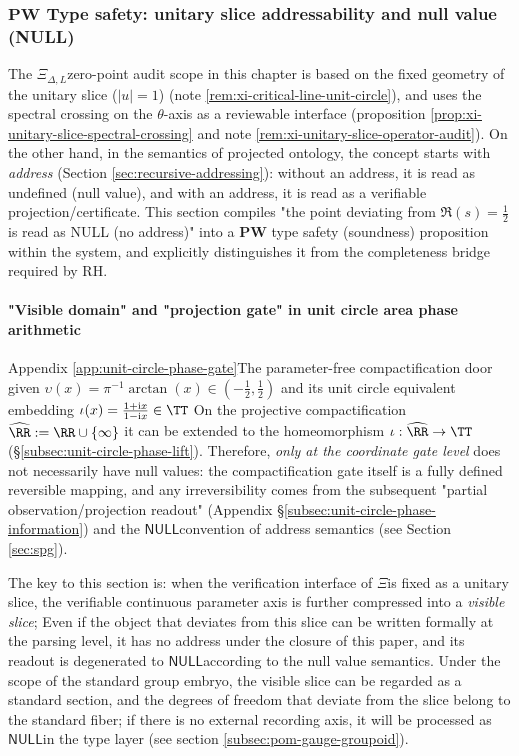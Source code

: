 \subsubsection{\texorpdfstring{$\mathbf{PW}$}{PW} Type safety: unitary slice addressability and null value (NULL)}\label{subsec:xi-pw-type-safety-null}
The \(\Xi_{\Delta,L}\) ​​zero-point audit scope in this chapter is based on the fixed geometry of the unitary slice (\(|u|=1\)) (note \ref{rem:xi-critical-line-unit-circle}), and uses the spectral crossing on the \(\theta\)-axis as a reviewable interface (proposition \ref{prop:xi-unitary-slice-spectral-crossing} and note \ref{rem:xi-unitary-slice-operator-audit}).
On the other hand, in the semantics of projected ontology, the concept starts with \emph{address} (Section \ref{sec:recursive-addressing}): without an address, it is read as undefined (null value), and with an address, it is read as a verifiable projection/certificate.
This section compiles "the point deviating from \(\Re(s)=\tfrac12\) ​​is read as NULL (no address)" into a \(\mathbf{PW}\) type safety (soundness) proposition within the system, and explicitly distinguishes it from the completeness bridge required by RH.

\paragraph{"Visible domain" and "projection gate" in unit circle area phase arithmetic}
Appendix \ref{app:unit-circle-phase-gate} ​​The parameter-free compactification door given
\(\upsilon(x)=\pi^{-1}\arctan(x)\in(-\tfrac12,\tfrac12)\)
and its unit circle equivalent embedding
\(\iota(x)=\frac{1+\mathrm{i}x}{1-\mathrm{i}x}\in\TT\)
On the projective compactification \(\widehat{\RR}:=\RR\cup\{\infty\}\) ​​it can be extended to the homeomorphism \(\iota:\widehat{\RR}\to\TT\) (\S\ref{subsec:unit-circle-phase-lift}).
Therefore, \emph{only at the coordinate gate level} does not necessarily have null values: the compactification gate itself is a fully defined reversible mapping, and any irreversibility comes from the subsequent "partial observation/projection readout" (Appendix \S\ref{subsec:unit-circle-phase-information}) and the \(\mathsf{NULL}\) ​​convention of address semantics (see Section \ref{sec:spg}).
\par
The key to this section is: when the verification interface of \(\Xi\) ​​is fixed as a unitary slice, the verifiable continuous parameter axis is further compressed into a \emph{visible slice};
Even if the object that deviates from this slice can be written formally at the parsing level, it has no address under the closure of this paper, and its readout is degenerated to \(\mathsf{NULL}\) ​​according to the null value semantics.
Under the scope of the standard group embryo, the visible slice can be regarded as a standard section, and the degrees of freedom that deviate from the slice belong to the standard fiber; if there is no external recording axis, it will be processed as \(\mathsf{NULL}\) ​​in the type layer (see section \ref{subsec:pom-gauge-groupoid}).

